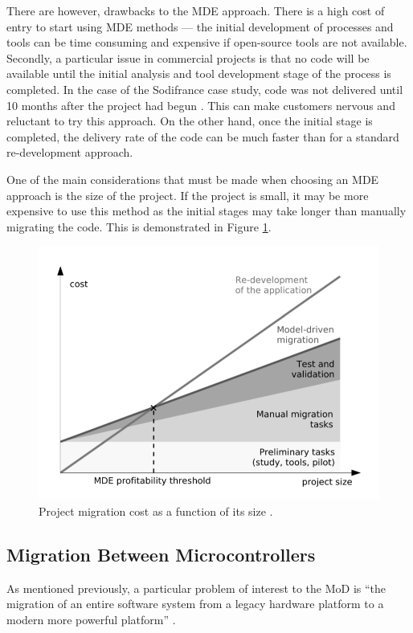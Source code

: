 \documentclass{UoYCSproject}
\begin{document}
There are however, drawbacks to the MDE approach. There is a high cost of entry to start using MDE methods --- the initial development of processes and tools can be time consuming and expensive if open-source tools are not available. Secondly, a particular issue in commercial projects is that no code will be available until the initial analysis and tool development stage of the process is completed. In the case of the Sodifrance case study, code was not delivered until 10 months after the project had begun \parencite{fleurey2007model}. This can make customers nervous and reluctant to try this approach. On the other hand, once the initial stage is completed, the delivery rate of the code can be much faster than for a standard re-development approach.

One of the main considerations that must be made when choosing an MDE approach is the size of the project. If the project is small, it may be more expensive to use this method as the initial stages may take longer than manually migrating the code. This is demonstrated in Figure \ref{fig:costvsize}.

\begin{figure}[h!]
  \includegraphics[width=\linewidth]{graphics/costvsize.png}
  \caption{Project migration cost as a function of its size \parencite{fleurey2007model}.}
  \label{fig:costvsize}
\end{figure}

\subsection{Migration Between Microcontrollers} \label{mc_migration}
As mentioned previously, a particular problem of interest to the MoD is ``the migration of an entire software system from a legacy hardware platform to a modern more powerful platform'' \parencite{gerasimou2017technical}.
\end{document}
